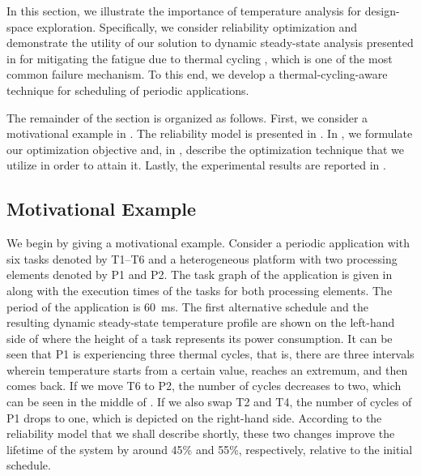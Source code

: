In this section, we illustrate the importance of temperature analysis for
design-space exploration. Specifically, we consider reliability optimization and
demonstrate the utility of our solution to dynamic steady-state analysis
presented in  for mitigating the fatigue due to
thermal cycling \cite{jedec2010}, which is one of the most common failure
mechanism. To this end, we develop a thermal-cycling-aware technique for
scheduling of periodic applications.

The remainder of the section is organized as follows. First, we consider a
motivational example in . The reliability model is
presented in . In , we
formulate our optimization objective and, in ,
describe the optimization technique that we utilize in order to attain it.
Lastly, the experimental results are reported in .

\subsection{Motivational Example}

We begin by giving a motivational example. Consider a periodic application with
six tasks denoted by T1--T6 and a heterogeneous platform with two processing
elements denoted by P1 and P2. The task graph of the application is given in
 along with the execution times of the tasks
for both processing elements. The period of the application is 60~ms. The first
alternative schedule and the resulting dynamic steady-state temperature profile
are shown on the left-hand side of  where the
height of a task represents its power consumption. It can be seen that P1 is
experiencing three thermal cycles, that is, there are three intervals wherein
temperature starts from a certain value, reaches an extremum, and then comes
back. If we move T6 to P2, the number of cycles decreases to two, which can be
seen in the middle of . If we also swap T2 and T4,
the number of cycles of P1 drops to one, which is depicted on the right-hand
side. According to the reliability model that we shall describe shortly, these
two changes improve the lifetime of the system by around 45\% and 55\%,
respectively, relative to the initial schedule.

